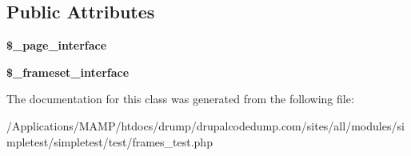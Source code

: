 \subsection*{Public Attributes}
\begin{DoxyCompactItemize}
\item 
\hypertarget{class_test_of_frameset_page_interface_ac8b52497b9763d0401b25b0f5db41388}{
{\bfseries \$\_\-page\_\-interface}}
\label{class_test_of_frameset_page_interface_ac8b52497b9763d0401b25b0f5db41388}

\item 
\hypertarget{class_test_of_frameset_page_interface_a1938f1c82b9bfbfb23f3f51aad1394bd}{
{\bfseries \$\_\-frameset\_\-interface}}
\label{class_test_of_frameset_page_interface_a1938f1c82b9bfbfb23f3f51aad1394bd}

\end{DoxyCompactItemize}


The documentation for this class was generated from the following file:\begin{DoxyCompactItemize}
\item 
/Applications/MAMP/htdocs/drump/drupalcodedump.com/sites/all/modules/simpletest/simpletest/test/frames\_\-test.php\end{DoxyCompactItemize}
